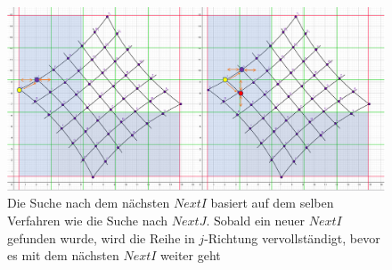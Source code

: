 %
%



\begin{figure}[!htb]
	\centering
	\includegraphics[width=0.8\linewidth]{images/VerzeichnetesSchachbrett_5.png}
	\caption[Suche nach dem nächsten $NextI$]{Die Suche nach dem nächsten $NextI$ basiert auf dem selben Verfahren wie die Suche nach $NextJ$. Sobald ein neuer $NextI$ gefunden wurde, wird die Reihe in $j$-Richtung vervollständigt, bevor es mit dem nächsten $NextI$ weiter geht}
	\label{fig:FindNextIPoint}
\end{figure}

